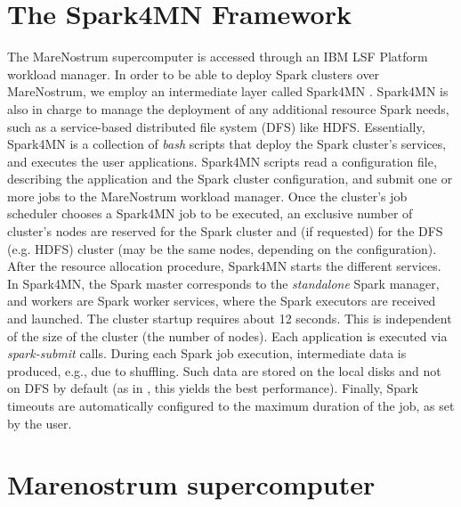 \documentclass[journal]{IEEEtran}
\begin{document}

\section{The Spark4MN Framework}
\label{sec:spark4mn}
The MareNostrum supercomputer is accessed through an IBM LSF Platform workload manager. In order to be able to deploy Spark clusters over MareNostrum, we employ an intermediate layer called Spark4MN \cite{conf/bigdataconf/TousGournaris15}. Spark4MN is also in charge to manage the deployment of any additional resource Spark needs, such as a service-based distributed file system (DFS) like HDFS.
Essentially, Spark4MN is a collection of {\it bash} scripts that deploy the Spark
cluster's services, and executes the user applications. Spark4MN scripts read a configuration file, describing the application and the Spark cluster configuration, and submit one or more jobs to the MareNostrum workload manager. Once the cluster's job scheduler chooses a Spark4MN job to be executed, an exclusive number of cluster's nodes are reserved for the Spark cluster and (if requested) for the DFS (e.g. HDFS) cluster (may be the same nodes, depending on the configuration). After the resource allocation procedure, Spark4MN starts the different services. In Spark4MN, the Spark master corresponds to the \emph{standalone} Spark manager, and workers are Spark
worker services, where the Spark executors are received and launched. The cluster startup requires about 12 seconds. This is independent of the size of the cluster (the number of nodes). Each application is executed via {\it spark-submit} calls. During each Spark job execution, intermediate data is produced, e.g., due to shuffling. Such data are stored on the local disks and not on DFS by default (as in \cite{michael2014}, this yields the best performance). Finally, Spark timeouts are automatically configured to the maximum duration of the job, as set by the user.

\section{Marenostrum supercomputer}
\label{sec:marenostrum}
\end{document}
